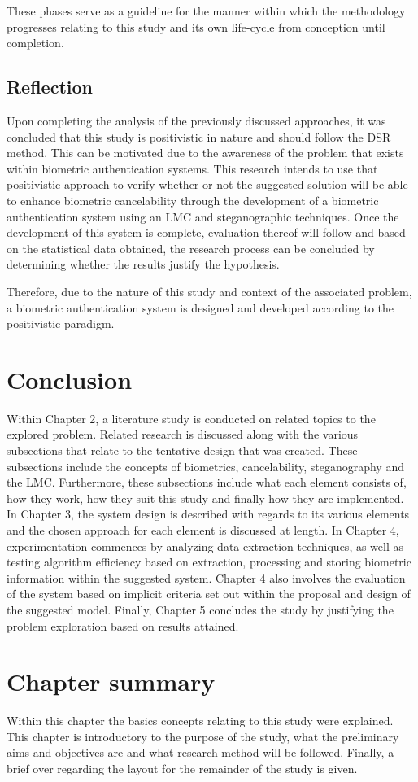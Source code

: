 These phases serve as a guideline for the manner within which the methodology progresses relating to this study and its own life-cycle from conception until completion. 

\subsection{Reflection}
Upon completing the analysis of the previously discussed approaches, it was concluded that this study is positivistic in nature and should follow the DSR method. This can be motivated due to the awareness of the problem that exists within biometric authentication systems. This research intends to use that positivistic approach to verify whether or not the suggested solution will be able to enhance biometric cancelability through the development of a biometric authentication system using an LMC and steganographic techniques. Once the development of this system is complete, evaluation thereof will follow and based on the statistical data obtained, the research process can be concluded by determining whether the results justify the hypothesis.

Therefore, due to the nature of this study and context of the associated problem, a biometric authentication system is designed and developed according to the positivistic paradigm.

\section{Conclusion}  %
\label{section1.6}
Within Chapter 2, a literature study is conducted on related topics to the explored problem. Related research is discussed along with the various subsections that relate to the tentative design that was created. These subsections include the concepts of biometrics, cancelability, steganography and the LMC. Furthermore, these subsections include what each element consists of, how they work, how they suit this study and finally how they are implemented.
In Chapter 3, the system design is described with regards to its various elements and the chosen approach for each element is discussed at length.
In Chapter 4, experimentation commences by analyzing data extraction techniques, as well as testing algorithm efficiency based on extraction, processing and storing biometric information within the suggested system. Chapter 4 also involves the evaluation of the system based on implicit criteria set out within the proposal and design of the suggested model.
Finally, Chapter 5 concludes the study by justifying the problem exploration based on results attained.

\section{Chapter summary}
\label{section1.7}
Within this chapter the basics concepts relating to this study were explained. This chapter is introductory to the purpose of the study, what the preliminary aims and objectives are and what research method will be followed. Finally, a brief over regarding the layout for the remainder of the study is given.
